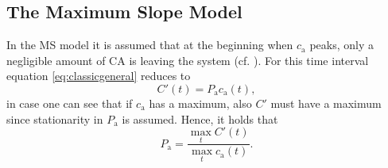 \documentclass[journal,twocolumn]{IEEEtran}
\newcommand{\ca}{c_\mathrm{a}}
\newcommand{\cout}{c_{\mathrm{v}}}
\newcommand{\Pa}{P_{\mathrm{a}}}
\begin{document}

	
	
	
	\subsection{The Maximum Slope Model}\label{sec:ms}	
	In the MS model it is assumed that at the beginning when $\ca$ peaks, only a negligible amount of CA is leaving the system (cf. \cite{klotz99}).
	For this time interval equation \eqref{eq:classicgeneral} reduces to 
	\begin{equation}
		C'(t) = \Pa\ca(t),
	\end{equation}
	in case one can see that if $\ca$ has a maximum, also $C'$ must have a maximum since stationarity in $\Pa$ is assumed.
	Hence, it holds that
	\begin{equation}\label{eq:MS}
		\Pa = \frac{\max_{t}C'(t)}{\max_{t}\ca(t)}.
	\end{equation}
	
	
	
\end{document}
